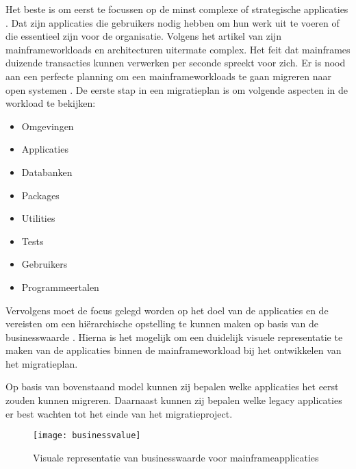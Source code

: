 Het beste is om eerst te focussen op de minst complexe of strategische applicaties \autocite{Korzenlowski2017}. Dat zijn applicaties die gebruikers nodig hebben om hun werk uit te voeren of die essentieel zijn voor de organisatie. Volgens het artikel van \textcite{Marble2017} zijn mainframeworkloads en architecturen uitermate complex. Het feit dat mainframes duizende transacties kunnen verwerken per seconde spreekt voor zich. Er is nood aan een perfecte planning om een mainframeworkloads te gaan migreren naar open systemen \autocite{Marble2017}. De eerste stap in een migratieplan is om volgende aspecten in de workload te bekijken:
    \begin{itemize}
        \item Omgevingen
        \item Applicaties
        \item Databanken
        \item Packages
        \item Utilities
        \item Tests
        \item Gebruikers
        \item Programmeertalen
    \end{itemize}
Vervolgens moet de focus gelegd worden op het doel van de applicaties en de vereisten om een hiërarchische opstelling te kunnen maken op basis van de businesswaarde \autocite{Marble2017}. Hierna is het mogelijk om een duidelijk visuele representatie te maken van de applicaties binnen de mainframeworkload bij het ontwikkelen van het migratieplan. 

\newpage

Op basis van bovenstaand model kunnen zij bepalen welke applicaties het eerst zouden kunnen migreren. Daarnaast kunnen zij bepalen welke legacy applicaties er best wachten tot het einde van het migratieproject. 

\begin{figure}
\texttt{[image: businessvalue]}
\caption{Visuale representatie van businesswaarde voor mainframeapplicaties \autocite{Marble2017}}
\end{figure}



\subsection{}
\label{sec:Workloads migreren naar de cloud}

